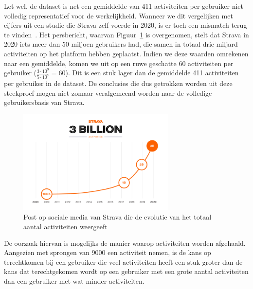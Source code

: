 Let wel, de dataset is net een gemiddelde van 411 activiteiten per gebruiker
niet volledig representatief voor de werkelijkheid. Wanneer we dit vergelijken
met cijfers uit een studie die Strava zelf voerde in 2020, is er toch een
mismatch terug te vinden~\cite{StravaMi72:online}. Het persbericht, waarvan
Figuur~\ref{fig:3billionUsers} is overgenomen, stelt dat Strava in 2020 iets
meer dan 50 miljoen gebruikers had, die samen in totaal drie miljard
activiteiten op het platform hebben geplaatst. Indien we deze waarden omrekenen
naar een gemiddelde, komen we uit op een ruwe geschatte 60 activiteiten per
gebruiker ($\frac{3 \cdot 10^9}{5 \cdot 10^7} = 60 $). Dit is een stuk lager
dan de gemiddelde 411 activiteiten per gebruiker in de dataset. De conclusies
die dus getrokken worden uit deze steekproef mogen niet zomaar veralgemeend
worden naar de volledige gebruikersbasis van Strava.
\begin{figure}[h]
    \centering
    \includegraphics[width=0.7\textwidth]{fig/Strava_3billion.png}
    \caption{Post op sociale media van Strava die de evolutie van het totaal aantal activiteiten weergeeft~\cite{StravaMi72:online}}\label{fig:3billionUsers}
\end{figure}

De oorzaak hiervan is mogelijks de manier waarop activiteiten worden afgehaald.
Aangezien \citeauthor{Dhondt} met sprongen van 9000 een activiteit nemen, is de
kans op terechtkomen bij een gebruiker die veel activiteiten heeft een stuk
groter dan de kans dat terechtgekomen wordt op een gebruiker met een grote
aantal activiteiten dan een gebruiker met wat minder activiteiten.

